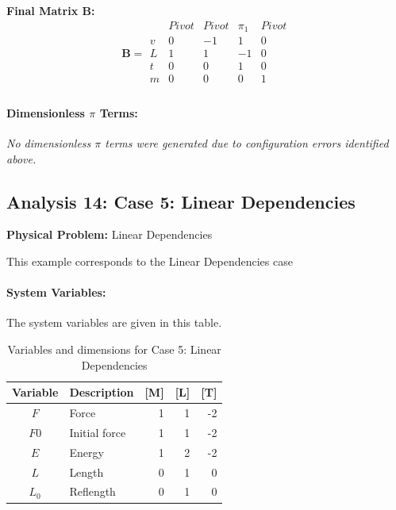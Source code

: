         \textbf{Final Matrix $\mathbf{B}$:}
        \[\mathbf{B} = \begin{array}{r|rrrr}
        & Pivot & Pivot & \pi_{1} & Pivot \\
        \hline
        v & 0 & -1 & 1 & 0 \\
L & 1 & 1 & -1 & 0 \\
t & 0 & 0 & 1 & 0 \\
m & 0 & 0 & 0 & 1 \\

        \end{array}\]

        \paragraph{Dimensionless $\pi$ Terms: }
        \textit{No dimensionless $\pi$ terms were generated due to configuration errors identified above.}


\subsection{Analysis 14: Case 5: Linear Dependencies}
\label{sec:Case_5_Linear_Dependencies}

\begin{problembox}
\textbf{Physical Problem:} Linear Dependencies
\end{problembox}

This example corresponds to the Linear Dependencies case

\paragraph{System Variables: } The system variables are given in this table.

\begin{table}[H]
\centering
\begin{tabular}{|c|l|r|r|r|}
\hline
\textbf{Variable} & \textbf{Description} & \textbf{[M]} & \textbf{[L]} & \textbf{[T]} \\
\hline
$F$ & Force & 1 & 1 & -2 \\
$F0$ & Initial force & 1 & 1 & -2 \\
$E$ & Energy & 1 & 2 & -2 \\
$L$ & Length & 0 & 1 & 0 \\
$L_0$ & Reflength & 0 & 1 & 0 \\

\hline
\end{tabular}
\caption{Variables and dimensions for Case 5: Linear Dependencies}
\end{table}

